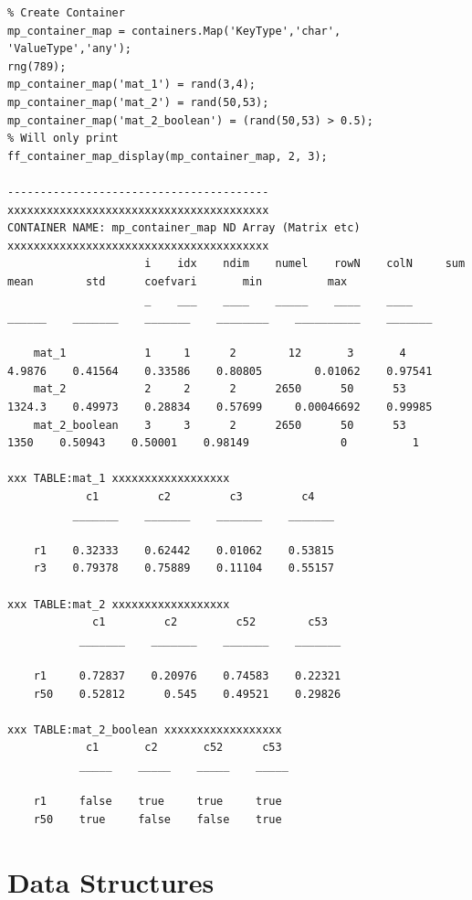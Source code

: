 \documentclass[
]{book}
\begin{document}
\begin{verbatim}
% Create Container
mp_container_map = containers.Map('KeyType','char', 'ValueType','any');
rng(789);
mp_container_map('mat_1') = rand(3,4);
mp_container_map('mat_2') = rand(50,53);
mp_container_map('mat_2_boolean') = (rand(50,53) > 0.5);
% Will only print 
ff_container_map_display(mp_container_map, 2, 3);

----------------------------------------
xxxxxxxxxxxxxxxxxxxxxxxxxxxxxxxxxxxxxxxx
CONTAINER NAME: mp_container_map ND Array (Matrix etc)
xxxxxxxxxxxxxxxxxxxxxxxxxxxxxxxxxxxxxxxx
                     i    idx    ndim    numel    rowN    colN     sum       mean        std      coefvari       min          max  
                     _    ___    ____    _____    ____    ____    ______    _______    _______    ________    __________    _______

    mat_1            1     1      2        12       3       4     4.9876    0.41564    0.33586    0.80805        0.01062    0.97541
    mat_2            2     2      2      2650      50      53     1324.3    0.49973    0.28834    0.57699     0.00046692    0.99985
    mat_2_boolean    3     3      2      2650      50      53       1350    0.50943    0.50001    0.98149              0          1

xxx TABLE:mat_1 xxxxxxxxxxxxxxxxxx
            c1         c2         c3         c4   
          _______    _______    _______    _______

    r1    0.32333    0.62442    0.01062    0.53815
    r3    0.79378    0.75889    0.11104    0.55157

xxx TABLE:mat_2 xxxxxxxxxxxxxxxxxx
             c1         c2         c52        c53  
           _______    _______    _______    _______

    r1     0.72837    0.20976    0.74583    0.22321
    r50    0.52812      0.545    0.49521    0.29826

xxx TABLE:mat_2_boolean xxxxxxxxxxxxxxxxxx
            c1       c2       c52      c53 
           _____    _____    _____    _____

    r1     false    true     true     true 
    r50    true     false    false    true
\end{verbatim}

\hypertarget{data-structures}{%
\chapter{Data Structures}\label{data-structures}}
\end{document}
